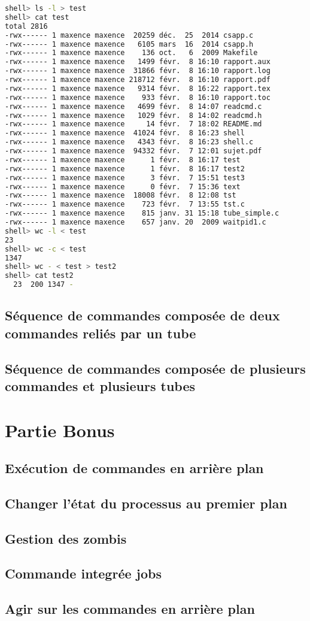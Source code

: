 \documentclass{report}
\begin{document}
		\begin{lstlisting}[frame=single,basicstyle=\footnotesize,language=bash]
shell> ls -l > test
shell> cat test
total 2816
-rwx------ 1 maxence maxence  20259 déc.  25  2014 csapp.c
-rwx------ 1 maxence maxence   6105 mars  16  2014 csapp.h
-rwx------ 1 maxence maxence    136 oct.   6  2009 Makefile
-rwx------ 1 maxence maxence   1499 févr.  8 16:10 rapport.aux
-rwx------ 1 maxence maxence  31866 févr.  8 16:10 rapport.log
-rwx------ 1 maxence maxence 218712 févr.  8 16:10 rapport.pdf
-rwx------ 1 maxence maxence   9314 févr.  8 16:22 rapport.tex
-rwx------ 1 maxence maxence    933 févr.  8 16:10 rapport.toc
-rwx------ 1 maxence maxence   4699 févr.  8 14:07 readcmd.c
-rwx------ 1 maxence maxence   1029 févr.  8 14:02 readcmd.h
-rwx------ 1 maxence maxence     14 févr.  7 18:02 README.md
-rwx------ 1 maxence maxence  41024 févr.  8 16:23 shell
-rwx------ 1 maxence maxence   4343 févr.  8 16:23 shell.c
-rwx------ 1 maxence maxence  94332 févr.  7 12:01 sujet.pdf
-rwx------ 1 maxence maxence      1 févr.  8 16:17 test
-rwx------ 1 maxence maxence      1 févr.  8 16:17 test2
-rwx------ 1 maxence maxence      3 févr.  7 15:51 test3
-rwx------ 1 maxence maxence      0 févr.  7 15:36 text
-rwx------ 1 maxence maxence  18008 févr.  8 12:08 tst
-rwx------ 1 maxence maxence    723 févr.  7 13:55 tst.c
-rwx------ 1 maxence maxence    815 janv. 31 15:18 tube_simple.c
-rwx------ 1 maxence maxence    657 janv. 20  2009 waitpid1.c
shell> wc -l < test
23
shell> wc -c < test
1347
shell> wc - < test > test2
shell> cat test2
  23  200 1347 -
		\end{lstlisting}
		\section{S\'equence de commandes compos\'ee de deux commandes reli\'es par un tube}
		\section{S\'equence de commandes compos\'ee de plusieurs commandes et plusieurs tubes}
	\chapter{Partie Bonus}
		\section{Ex\'ecution de commandes en arri\`ere plan}
		\section{Changer l'\'etat du processus au premier plan}
		\section{Gestion des zombis}
		\section{Commande integr\'ee jobs}
		\section{Agir sur les commandes en arri\`ere plan}
\end{document}
